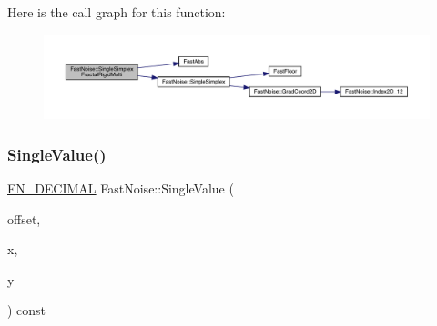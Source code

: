 Here is the call graph for this function\+:
\nopagebreak
\begin{figure}[H]
\begin{center}
\leavevmode
\includegraphics[width=350pt]{d1/dd8/class_fast_noise_a6a1e4725751d679b33705fa5867f7525_cgraph}
\end{center}
\end{figure}
\mbox{\label{class_fast_noise_a9704c1a9f62ad5fcf8e42b15ad8df389}} 
\subsubsection{\texorpdfstring{Single\+Value()}{SingleValue()}\hspace{0.1cm}{\footnotesize\ttfamily [1/2]}}
{\footnotesize\ttfamily \mbox{\hyperlink{_fast_noise_8h_a75a9ef6d2541c4921815b885bfd449c3}{F\+N\+\_\+\+D\+E\+C\+I\+M\+AL}} Fast\+Noise\+::\+Single\+Value (\begin{DoxyParamCaption}\item[{unsigned char}]{offset,  }\item[{\mbox{\hyperlink{_fast_noise_8h_a75a9ef6d2541c4921815b885bfd449c3}{F\+N\+\_\+\+D\+E\+C\+I\+M\+AL}}}]{x,  }\item[{\mbox{\hyperlink{_fast_noise_8h_a75a9ef6d2541c4921815b885bfd449c3}{F\+N\+\_\+\+D\+E\+C\+I\+M\+AL}}}]{y }\end{DoxyParamCaption}) const\hspace{0.3cm}{\ttfamily [private]}}

